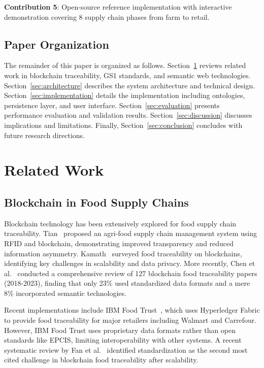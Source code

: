 \documentclass[preprint,review,12pt,authoryear]{elsarticle}
\begin{document}
\textbf{Contribution 5}: Open-source reference implementation with interactive demonstration covering 8 supply chain phases from farm to retail.

\subsection{Paper Organization}

The remainder of this paper is organized as follows. Section~\ref{sec:related} reviews related work in blockchain traceability, GS1 standards, and semantic web technologies. Section~\ref{sec:architecture} describes the system architecture and technical design. Section~\ref{sec:implementation} details the implementation including ontologies, persistence layer, and user interface. Section~\ref{sec:evaluation} presents performance evaluation and validation results. Section~\ref{sec:discussion} discusses implications and limitations. Finally, Section~\ref{sec:conclusion} concludes with future research directions.

\section{Related Work}\label{sec:related}

\subsection{Blockchain in Food Supply Chains}

Blockchain technology has been extensively explored for food supply chain traceability. Tian~\cite{tian2016supply} proposed an agri-food supply chain management system using RFID and blockchain, demonstrating improved transparency and reduced information asymmetry. Kamath~\cite{kamath2018food} surveyed food traceability on blockchains, identifying key challenges in scalability and data privacy. More recently, Chen et al.~\cite{chen2023blockchain} conducted a comprehensive review of 127 blockchain food traceability papers (2018-2023), finding that only 23\% used standardized data formats and a mere 8\% incorporated semantic technologies.

Recent implementations include IBM Food Trust~\cite{ibmdocs}, which uses Hyperledger Fabric to provide food traceability for major retailers including Walmart and Carrefour. However, IBM Food Trust uses proprietary data formats rather than open standards like EPCIS, limiting interoperability with other systems. A recent systematic review by Fan et al.~\cite{fan2023systematic} identified standardization as the second most cited challenge in blockchain food traceability after scalability.
\end{document}
